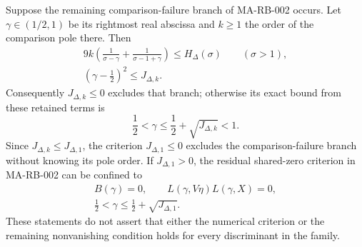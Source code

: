 Suppose the remaining comparison-failure branch of
MA-RB-002 occurs.  Let \(\gamma\in(1/2,1)\) be its
rightmost real abscissa and \(k\ge1\) the order of the
comparison pole there.  Then
\[
 \begin{gathered}
 9k\left(\frac1{\sigma-\gamma}
               +\frac1{\sigma-1+\gamma}\right)
                  \le H_\Delta(\sigma)\qquad(\sigma>1),\\
             (\gamma-\tfrac12)^2\le J_{\Delta,k}.
 \end{gathered}
 \tag{MA-RB.73}
\]
Consequently \(J_{\Delta,k}\le0\) excludes that branch;
otherwise its exact bound from these retained terms is
\[
             \frac12<\gamma
                  \le\frac12+\sqrt{J_{\Delta,k}}<1.
 \tag{MA-RB.74}
\]
Since \(J_{\Delta,k}\le J_{\Delta,1}\), the criterion
\(J_{\Delta,1}\le0\) excludes the comparison-failure
branch without knowing its pole order.  If
\(J_{\Delta,1}>0\), the residual shared-zero criterion
in MA-RB-002 can be confined to
\[
 \begin{gathered}
 B(\gamma)=0,\qquad L(\gamma,V\eta)L(\gamma,X)=0,\\
 \frac12<\gamma\le\frac12+\sqrt{J_{\Delta,1}}.
 \end{gathered}
 \tag{MA-RB.75}
\]
These statements do not assert that either the numerical
criterion or the remaining nonvanishing condition holds
for every discriminant in the family.

